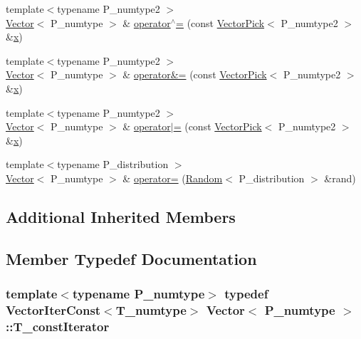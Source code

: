 \begin{DoxyCompactItemize}
\item 
{\footnotesize template$<$typename P\+\_\+numtype2 $>$ }\\\hyperlink{classVector}{Vector}$<$ P\+\_\+numtype $>$ \& \hyperlink{classVector_a06479b5e6a8a728ef12f909892295dc4}{operator$^\wedge$=} (const \hyperlink{classVectorPick}{Vector\+Pick}$<$ P\+\_\+numtype2 $>$ \&\hyperlink{vecnorm1_8cc_ac73eed9e41ec09d58f112f06c2d6cb63}{x})
\item 
{\footnotesize template$<$typename P\+\_\+numtype2 $>$ }\\\hyperlink{classVector}{Vector}$<$ P\+\_\+numtype $>$ \& \hyperlink{classVector_ab8d73b56612ea43e46cdbad6e60f107e}{operator\&=} (const \hyperlink{classVectorPick}{Vector\+Pick}$<$ P\+\_\+numtype2 $>$ \&\hyperlink{vecnorm1_8cc_ac73eed9e41ec09d58f112f06c2d6cb63}{x})
\item 
{\footnotesize template$<$typename P\+\_\+numtype2 $>$ }\\\hyperlink{classVector}{Vector}$<$ P\+\_\+numtype $>$ \& \hyperlink{classVector_abaf99f900d625bedae835e0d07b1c816}{operator$\vert$=} (const \hyperlink{classVectorPick}{Vector\+Pick}$<$ P\+\_\+numtype2 $>$ \&\hyperlink{vecnorm1_8cc_ac73eed9e41ec09d58f112f06c2d6cb63}{x})
\item 
{\footnotesize template$<$typename P\+\_\+distribution $>$ }\\\hyperlink{classVector}{Vector}$<$ P\+\_\+numtype $>$ \& \hyperlink{classVector_a6c7df1a7924c08cddd859be330f33367}{operator=} (\hyperlink{classRandom}{Random}$<$ P\+\_\+distribution $>$ \&rand)
\end{DoxyCompactItemize}
\subsection*{Additional Inherited Members}


\subsection{Member Typedef Documentation}
\hypertarget{classVector_a6713f9dd10d7bd7d91b7452cf0208565}{}
\subsubsection[{T\+\_\+const\+Iterator}]{\setlength{\rightskip}{0pt plus 5cm}template$<$typename P\+\_\+numtype$>$ typedef {\bf Vector\+Iter\+Const}$<${\bf T\+\_\+numtype}$>$ {\bf Vector}$<$ P\+\_\+numtype $>$\+::{\bf T\+\_\+const\+Iterator}}\label{classVector_a6713f9dd10d7bd7d91b7452cf0208565}
\hypertarget{classVector_aa02a1323b0f3ca8c6cc82732fad69768}{}
